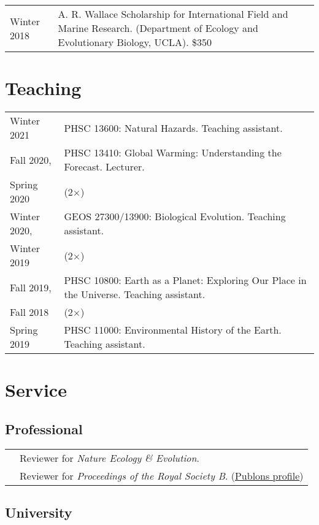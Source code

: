 \documentclass[10pt]{article}
\begin{document}
\begin{tabularx}{\textwidth}{>{\raggedleft\arraybackslash}p{2.2cm} X}
Winter 2018 & A. R. Wallace Scholarship for International Field and Marine Research. (Department of Ecology and Evolutionary Biology, UCLA). \$350
\end{tabularx}

\section*{Teaching}

\begin{tabularx}{\textwidth}{>{\raggedleft\arraybackslash}p{2.2cm} X}
Winter 2021 & PHSC 13600: Natural Hazards. Teaching assistant. \\[0.1cm]
Fall 2020, & PHSC 13410: Global Warming: Understanding the Forecast. Lecturer. \\
Spring 2020 & (2$\times$) \\[0.1cm]
Winter 2020, & GEOS 27300/13900: Biological Evolution. Teaching assistant. \\
Winter 2019 & (2$\times$) \\[0.1cm]
Fall 2019, & PHSC 10800: Earth as a Planet: Exploring Our Place in the Universe. Teaching assistant. \\
Fall 2018 & (2$\times$) \\[0.1cm]
Spring 2019 & PHSC 11000: Environmental History of the Earth. Teaching assistant.
\end{tabularx}

\section*{Service}

\subsection*{Professional}

\begin{tabularx}{\textwidth}{>{\raggedleft\arraybackslash}p{2.2cm} X}
2020 & Reviewer for \textit{Nature Ecology \& Evolution}. \\[0.1cm]
2019 & Reviewer for \textit{Proceedings of the Royal Society B}. (\href{https://publons.com/a/3033367}{Publons profile})
\end{tabularx}

\subsection*{University}
\end{document}
